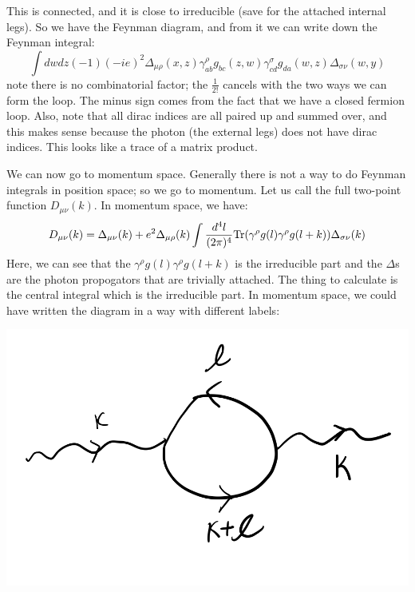 This is connected, and it is close to irreducible (save for the attached internal legs). So we have the Feynman diagram, and from it we can write down the Feynman integral:
\begin{equation}
    \int dw dz (-1)(-ie)^2 \Delta_{\mu\rho}(x, z)\gamma^\rho_{ab}g_{bc}(z, w)\gamma^\sigma_{cd}g_{da}(w, z)\Delta_{\sigma\nu}(w, y)
\end{equation}
note there is no combinatorial factor; the $\frac{1}{2!}$ cancels with the two ways we can form the loop. The minus sign comes from the fact that we have a closed fermion loop. Also, note that all dirac indices are all paired up and summed over, and this makes sense because the photon (the external legs) does not have dirac indices. This looks like a trace of a matrix product.

We can now go to momentum space. Generally there is not a way to do Feynman integrals in position space; so we go to momentum. Let us call the full two-point function $D_{\mu\nu}(k)$. In momentum space, we have:
\begin{equation}
    D_{\mu\nu}(k) = \Delta_{\mu\nu}(k) + e^2 \Delta_{\mu\rho}(k) \int \frac{d^4l}{(2\pi)^4}\mathrm{Tr}(\gamma^\rho g(l)\gamma^\rho g(l+k))\Delta_{\sigma\nu}(k)
\end{equation}
Here, we can see that the $\gamma^\rho g(l)\gamma^\rho g(l+k)$ is the irreducible part and the $\Delta$s are the photon propogators that are trivially attached. The thing to calculate is the central integral which is the irreducible part. In momentum space, we could have written the diagram in a way with different labels:

\begin{center}
    \includegraphics[scale=0.5]{Images/fig-lec31p9.png}
\end{center}
